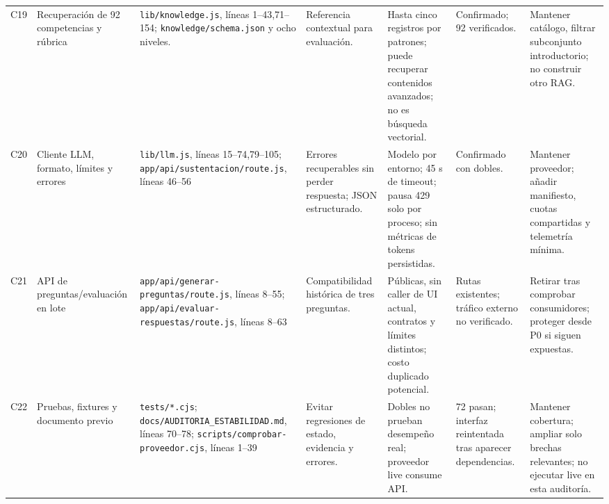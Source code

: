 \documentclass[11pt,a4paper]{report}
\newcommand{\src}[2]{\nolinkurl{#1}, líneas #2}
\begin{document}
\begin{landscape}
\begin{longtable}{P{0.8cm}P{3cm}P{5.1cm}P{4cm}P{3.6cm}P{2.5cm}P{4.4cm}}
C19 & Recuperación de 92 competencias y rúbrica & \src{lib/knowledge.js}{1--43,71--154}; \nolinkurl{knowledge/schema.json} y ocho niveles. & Referencia contextual para evaluación. & Hasta cinco registros por patrones; puede recuperar contenidos avanzados; no es búsqueda vectorial. & Confirmado; 92 verificados. & Mantener catálogo, filtrar subconjunto introductorio; no construir otro RAG.\\
C20 & Cliente LLM, formato, límites y errores & \src{lib/llm.js}{15--74,79--105}; \src{app/api/sustentacion/route.js}{46--56} & Errores recuperables sin perder respuesta; JSON estructurado. & Modelo por entorno; 45 s de timeout; pausa 429 solo por proceso; sin métricas de tokens persistidas. & Confirmado con dobles. & Mantener proveedor; añadir manifiesto, cuotas compartidas y telemetría mínima.\\
C21 & API de preguntas/evaluación en lote & \src{app/api/generar-preguntas/route.js}{8--55}; \src{app/api/evaluar-respuestas/route.js}{8--63} & Compatibilidad histórica de tres preguntas. & Públicas, sin caller de UI actual, contratos y límites distintos; costo duplicado potencial. & Rutas existentes; tráfico externo no verificado. & Retirar tras comprobar consumidores; proteger desde P0 si siguen expuestas.\\
C22 & Pruebas, fixtures y documento previo & \nolinkurl{tests/*.cjs}; \src{docs/AUDITORIA_ESTABILIDAD.md}{70--78}; \src{scripts/comprobar-proveedor.cjs}{1--39} & Evitar regresiones de estado, evidencia y errores. & Dobles no prueban desempeño real; proveedor live consume API. & 72 pasan; interfaz reintentada tras aparecer dependencias. & Mantener cobertura; ampliar solo brechas relevantes; no ejecutar live en esta auditoría.\\\bottomrule
\end{longtable}
\end{landscape}
\end{document}
